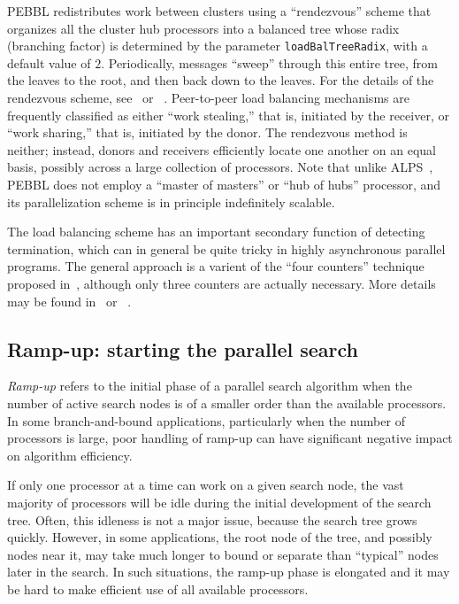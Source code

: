 PEBBL redistributes work between clusters using a ``rendezvous''
scheme that organizes all the cluster hub processors into a balanced
tree whose radix (branching factor) is determined by the parameter
\texttt{loadBalTreeRadix}, with a default value of $2$.  Periodically,
messages ``sweep'' through this entire tree, from the leaves to the
root, and then back down to the leaves.  For the details of the
rendezvous scheme, see~\cite[Section 4.4]{EPH00} or ~\cite[Section
4.3]{EPH00a}.  Peer-to-peer load balancing mechanisms are frequently
classified as either ``work stealing,'' that is, initiated by the
receiver, or ``work sharing,'' that is, initiated by the donor.  The
rendezvous method is neither; instead, donors and receivers
efficiently locate one another on an equal basis, possibly across a
large collection of processors.  Note that unlike ALPS~\cite{RLS04},
PEBBL does not employ a ``master of masters'' or ``hub of hubs''
processor, and its parallelization scheme is in principle indefinitely
scalable. 

The load balancing scheme has an important secondary function of
detecting termination, which can in general be quite tricky in highly
asynchronous parallel programs.  The general approach is a varient of
the ``four counters'' technique proposed in~\cite{Mat87}, although
only three counters are actually necessary.  More details may be found
in~\cite[Section 4.6]{EPH00} or ~\cite[Section 4.5]{EPH00a}.


\subsection{Ramp-up: starting the parallel search}
\label{sec:rampup}
\emph{Ramp-up} refers to the initial phase of a parallel search
algorithm when the number of active search nodes is of a smaller order
than the available processors.  In some branch-and-bound applications,
particularly when the number of processors is large, poor handling of
ramp-up can have significant negative impact on algorithm efficiency.

If only one processor at a time can work on a given search node, the
vast majority of processors will be idle during the initial
development of the search tree.  Often, this idleness is not a major
issue, because the search tree grows quickly.  However, in some
applications, the root node of the tree, and possibly nodes near
it, may take much longer to bound or separate than ``typical'' nodes
later in the search.  In such situations, the ramp-up phase is
elongated and it may be hard to make efficient use of all available
processors.

